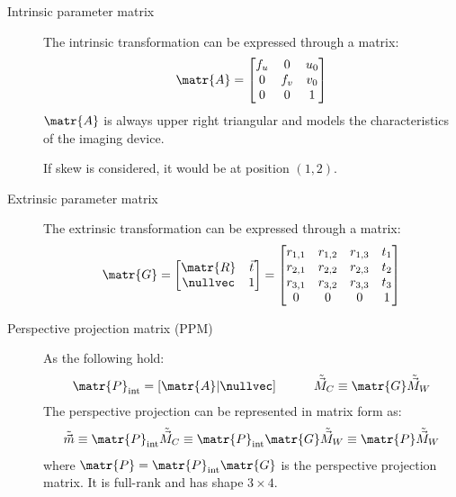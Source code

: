 \begin{description}
    \item[Intrinsic parameter matrix] 
        The intrinsic transformation can be expressed through a matrix:
        \[ 
            \matr{A} = 
                \begin{bmatrix}
                    f_u & 0 & u_0 \\ 0 & f_v & v_0 \\ 0 & 0 & 1
                \end{bmatrix} 
        \]
        $\matr{A}$ is always upper right triangular and models the characteristics of the imaging device.
        
        \begin{remark}
            If skew is considered, it would be at position $(1, 2)$.
        \end{remark}

    \item[Extrinsic parameter matrix] 
        The extrinsic transformation can be expressed through a matrix:
        \[ 
            \matr{G} =  
            \begin{bmatrix} \matr{R} & \vec{t} \\ \nullvec & 1 \end{bmatrix} =
            \begin{bmatrix} 
                r_{1,1} & r_{1,2} & r_{1,3} & t_1 \\ 
                r_{2,1} & r_{2,2} & r_{2,3} & t_2 \\ 
                r_{3,1} & r_{3,2} & r_{3,3} & t_3 \\ 
                0 & 0 & 0 & 1
            \end{bmatrix}
        \]

    \item[Perspective projection matrix (PPM)] 
        As the following hold: 
        \[
            \matr{P}_\text{int} = [ \matr{A} | \nullvec ] \hspace{3em} \tilde{\vec{M}}_C \equiv \matr{G} \tilde{\vec{M}}_W
        \]
        The perspective projection can be represented in matrix form as:
        \[ \tilde{\vec{m}} \equiv \matr{P}_\text{int} \tilde{\vec{M}}_C \equiv \matr{P}_\text{int} \matr{G} \tilde{\vec{M}}_W \equiv \matr{P} \tilde{\vec{M}}_W \]
        where $\matr{P} = \matr{P}_\text{int} \matr{G}$ is the perspective projection matrix. It is full-rank and has shape $3 \times 4$.


\end{description}
